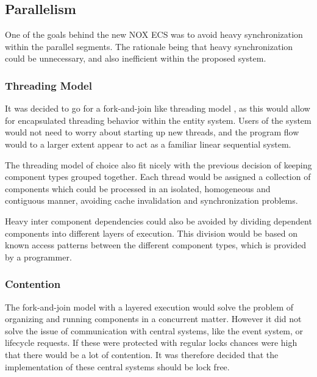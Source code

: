 \subsection{Parallelism}
One of the goals behind the new NOX ECS was to avoid heavy synchronization within the parallel segments.
The rationale being that heavy synchronization could be unnecessary, and also inefficient within the proposed system.

\subsubsection{Threading Model}
It was decided to go for a fork-and-join like threading model ,
as this would allow for encapsulated threading behavior within the entity system.
Users of the system would not need to worry about starting up new threads,
and the program flow would to a larger extent appear to act as a familiar linear sequential system.

The threading model of choice also fit nicely with the previous decision of keeping component types
grouped together.
Each thread would be assigned a collection of components which could be processed in an isolated,
homogeneous and contiguous manner, avoiding cache invalidation and synchronization problems.

Heavy inter component dependencies could also be avoided by dividing dependent components
into different layers of execution. 
This division would be based on known access patterns between the different component types,
which is provided by a programmer.

\subsubsection{Contention}
The fork-and-join model with a layered execution would solve the problem of organizing and running components
in a concurrent matter. However it did not solve the issue of communication with central systems, like the event system, or lifecycle requests.
If these were protected with regular locks chances were high that there would be a lot of contention.
It was therefore decided that the implementation of these central systems should be lock free.
